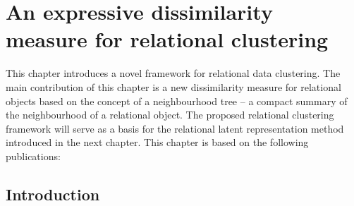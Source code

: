 \chapter{An expressive dissimilarity measure for relational clustering}\label{ch:clustering}


This chapter introduces a novel framework for relational data clustering.
The main contribution of this chapter is a new dissimilarity measure for relational objects based on the concept of a neighbourhood tree -- a compact summary of the neighbourhood of a relational object.
The proposed relational clustering framework will serve as a basis for the relational latent representation method introduced in the next chapter.
This chapter is based on the following publications:

\begin{quote}
\end{quote}

\begin{quote}
\end{quote}




\section{Introduction}
\label{sec:Intro}




